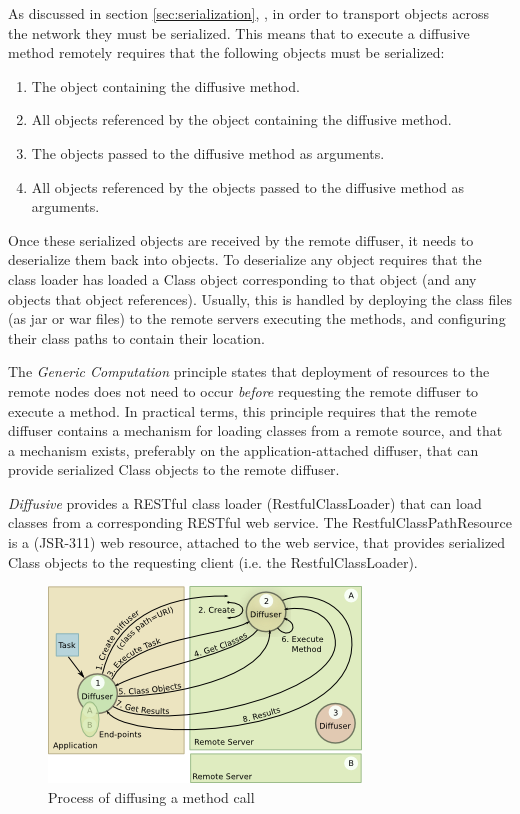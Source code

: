 \documentclass[11pt]{article}
\begin{document}
As discussed in section \ref{sec:serialization}, , in order to transport objects across the network they must be serialized. This means that to execute a diffusive method remotely requires that the following objects must be serialized:
\begin{enumerate}
\item The object containing the diffusive method.
\item All objects referenced by the object containing the diffusive method.
\item The objects passed to the diffusive method as arguments.
\item All objects referenced by the objects passed to the diffusive method as arguments.
\end{enumerate}
Once these serialized objects are received by the remote diffuser, it needs to deserialize them back into objects. To deserialize any object requires that the class loader has loaded a \textsf{Class} object corresponding to that object (and any objects that object references). Usually, this is handled by deploying the class files (as jar or war files) to the remote servers executing the methods, and configuring their class paths to contain their location.

The \emph{Generic Computation} principle states that deployment of resources to the remote nodes does not need to occur \emph{before} requesting the remote diffuser to execute a method. In practical terms, this principle requires that the remote diffuser contains a mechanism for loading classes from a remote source, and that a mechanism exists, preferably on the application-attached diffuser, that can provide serialized \textsf{Class} objects to the remote diffuser. 

\emph{Diffusive} provides a RESTful class loader (\textsf{RestfulClassLoader}) that can load classes from a corresponding RESTful web service. The \textsf{RestfulClassPathResource} is a (JSR-311) web resource, attached to the web service, that provides serialized \textsf{Class} objects to the requesting client (i.e. the \textsf{RestfulClassLoader}). 

\begin{figure}[htbp]
\begin{center}
\includegraphics[scale=1.1]{diffusing}
\caption{Process of diffusing a method call}
\label{fig:diffusing}
\end{center}
\end{figure}
\end{document}
